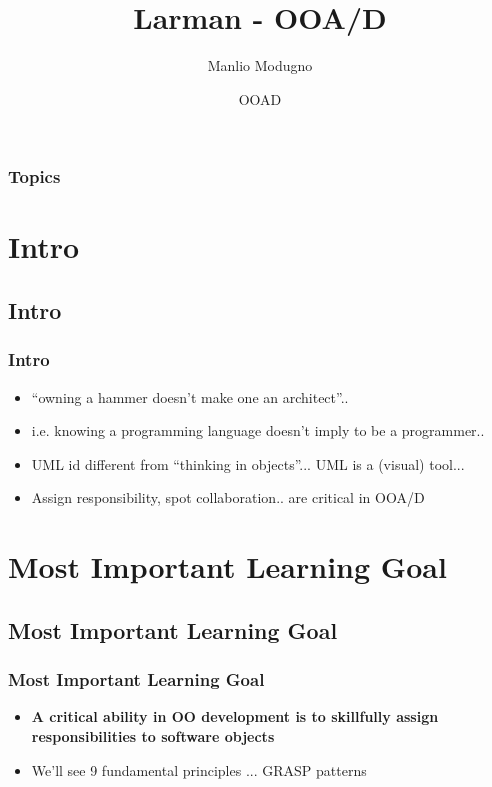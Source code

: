 \documentclass{beamer}
\title{Larman - OOA/D}
\author{Manlio Modugno}
\institute[GMTechnologies]
\date[]{OOAD}
\begin{document}
\begin{frame}
  \titlepage
\end{frame}

\begin{frame}
  \frametitle{Topics}
  \tableofcontents
\end{frame}


\section{Intro}
\subsection{Intro}
\begin{frame}
  \frametitle{Intro}
  \begin{itemize}
	\item<+-> ``owning a hammer doesn't make one an architect''..
	\item<+-> i.e. knowing a programming language doesn't imply to be a programmer..
	\item<+-> UML id different from ``thinking in objects''... UML is a (visual) tool...
	\item<+-> Assign responsibility, spot collaboration.. are critical in OOA/D
   \end{itemize}
\end{frame}

\section{Most Important Learning Goal}
\subsection{Most Important Learning Goal}
\begin{frame}
  \frametitle{Most Important Learning Goal}
  \begin{itemize}
	\item<+-> \textbf{A critical ability in OO development is to skillfully assign responsibilities to software objects}
	\item<+-> We'll see 9 fundamental principles ... GRASP patterns
   \end{itemize}
\end{frame}

\end{document}
